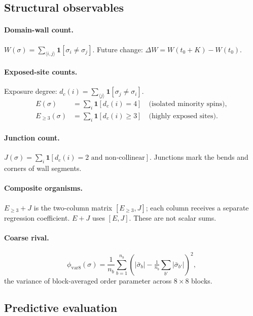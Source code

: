 \documentclass[11pt,a4paper]{article}
\begin{document}
\subsection{Structural observables}

\paragraph{Domain-wall count.}
$W(\sigma) = \sum_{\langle i,j\rangle}\mathbf{1}[\sigma_i \neq \sigma_j]$.
Future change: $\Delta W = W(t_0+K) - W(t_0)$.

\paragraph{Exposed-site counts.}
Exposure degree: $d_c(i) = \sum_{\langle j\rangle}\mathbf{1}[\sigma_j\neq\sigma_i]$.
\begin{align}
E(\sigma) &= \sum_i \mathbf{1}[d_c(i) = 4] \quad \text{(isolated minority spins)},\\
E_{\geq 3}(\sigma) &= \sum_i \mathbf{1}[d_c(i) \geq 3] \quad
\text{(highly exposed sites)}.
\end{align}

\paragraph{Junction count.}
$J(\sigma) = \sum_i \mathbf{1}[\text{$d_c(i)=2$ and non-collinear}]$.
Junctions mark the bends and corners of wall segments.

\paragraph{Composite organisms.}
$E_{\geq 3}+J$ is the two-column matrix $[E_{\geq 3}, J]$; each column
receives a separate regression coefficient.
$E+J$ uses $[E, J]$.
These are not scalar sums.

\paragraph{Coarse rival.}
\begin{equation}
\phi_{\mathrm{var8}}(\sigma) =
\frac{1}{n_b}\sum_{b=1}^{n_b}
\!\left(|\bar\sigma_b| - \tfrac{1}{n_b}\sum_{b'}|\bar\sigma_{b'}|\right)^2,
\end{equation}
the variance of block-averaged order parameter across $8\times 8$ blocks.

\subsection{Predictive evaluation}
\end{document}
